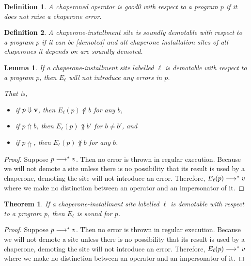 \documentclass{sigplanconf}
\newtheorem{definition}{Definition}
\newtheorem{theorem}{Theorem}
\newtheorem{lemma}{Lemma}
\begin{document}
\begin{definition}
A chaperoned operator is \emph{good0} with respect to a program $p$ if it does not raise a chaperone error.
\end{definition}

\begin{definition}
A chaperone-installment site is soundly \emph{demotable} with respect to a program $p$ if it can be [demoted] and all chaperone installation sites of all chaperones it depends on are soundly demoted.
\end{definition}

\begin{lemma}
If a chaperone-installment site labelled $\ell$ is demotable with respect to a program $p$, then $E_\ell$ will not introduce any errors in $p$.

That is,
\begin{itemize}
\item if $p\Downarrow\mathbf{v}$, then $E_\ell(p)\not\Uparrow b$ for any $b$,
\item if $p\Uparrow b$, then $E_\ell(p)\not\Uparrow b'$ for $b\ne b'$, and
\item if $p\Uparrow$, then $E_\ell(p)\not\Uparrow b$ for any $b$.
\end{itemize}
\end{lemma}

\begin{proof}
Suppose $p\longrightarrow^{*} v$.
Then no error is thrown in regular execution.
Because we will not demote a site unless there is no possibility that its result is used by a chaperone, demoting the site will not introduce an error.
Therefore, $E_\ell(p)\longrightarrow^{*} v$ where we make no distinction between an operator and an impersonator of it.

\end{proof}

\begin{theorem}
If a chaperone-installment site labelled $\ell$ is demotable with respect to a program $p$, then $E_\ell$ is sound for $p$.
\end{theorem}

\begin{proof}
Suppose $p\longrightarrow^{*} v$.
Then no error is thrown in regular execution.
Because we will not demote a site unless there is no possibility that its result is used by a chaperone, demoting the site will not introduce an error.
Therefore, $E_\ell(p)\longrightarrow^{*} v$ where we make no distinction between an operator and an impersonator of it.


\end{proof}
\end{document}
